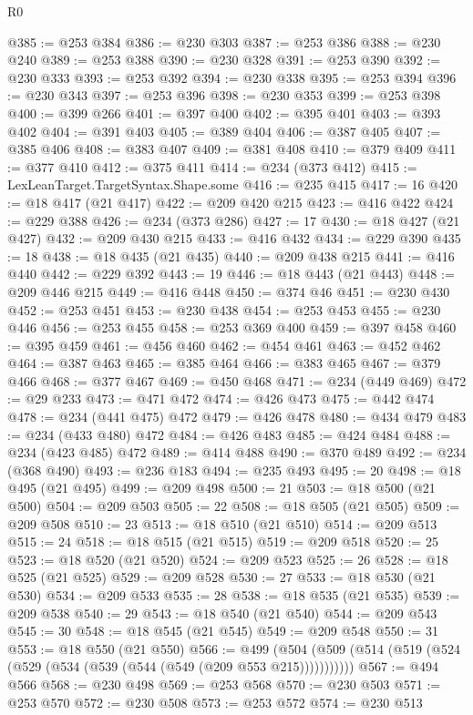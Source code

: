 \begin{lexlean}{R0}
\begin{coremodule}
@385 := @253 @384
@386 := @230 @303
@387 := @253 @386
@388 := @230 @240
@389 := @253 @388
@390 := @230 @328
@391 := @253 @390
@392 := @230 @333
@393 := @253 @392
@394 := @230 @338
@395 := @253 @394
@396 := @230 @343
@397 := @253 @396
@398 := @230 @353
@399 := @253 @398
@400 := @399 @266
@401 := @397 @400
@402 := @395 @401
@403 := @393 @402
@404 := @391 @403
@405 := @389 @404
@406 := @387 @405
@407 := @385 @406
@408 := @383 @407
@409 := @381 @408
@410 := @379 @409
@411 := @377 @410
@412 := @375 @411
@414 := @234 (@373 @412)
@415 := LexLeanTarget.TargetSyntax.Shape.some
@416 := @235 @415
@417 := 16
@420 := @18 @417 (@21 @417)
@422 := @209 @420 @215
@423 := @416 @422
@424 := @229 @388
@426 := @234 (@373 @286)
@427 := 17
@430 := @18 @427 (@21 @427)
@432 := @209 @430 @215
@433 := @416 @432
@434 := @229 @390
@435 := 18
@438 := @18 @435 (@21 @435)
@440 := @209 @438 @215
@441 := @416 @440
@442 := @229 @392
@443 := 19
@446 := @18 @443 (@21 @443)
@448 := @209 @446 @215
@449 := @416 @448
@450 := @374 @46
@451 := @230 @430
@452 := @253 @451
@453 := @230 @438
@454 := @253 @453
@455 := @230 @446
@456 := @253 @455
@458 := @253 @369 @400
@459 := @397 @458
@460 := @395 @459
@461 := @456 @460
@462 := @454 @461
@463 := @452 @462
@464 := @387 @463
@465 := @385 @464
@466 := @383 @465
@467 := @379 @466
@468 := @377 @467
@469 := @450 @468
@471 := @234 (@449 @469)
@472 := @29 @233
@473 := @471 @472
@474 := @426 @473
@475 := @442 @474
@478 := @234 (@441 @475) @472
@479 := @426 @478
@480 := @434 @479
@483 := @234 (@433 @480) @472
@484 := @426 @483
@485 := @424 @484
@488 := @234 (@423 @485) @472
@489 := @414 @488
@490 := @370 @489
@492 := @234 (@368 @490)
@493 := @236 @183
@494 := @235 @493
@495 := 20
@498 := @18 @495 (@21 @495)
@499 := @209 @498
@500 := 21
@503 := @18 @500 (@21 @500)
@504 := @209 @503
@505 := 22
@508 := @18 @505 (@21 @505)
@509 := @209 @508
@510 := 23
@513 := @18 @510 (@21 @510)
@514 := @209 @513
@515 := 24
@518 := @18 @515 (@21 @515)
@519 := @209 @518
@520 := 25
@523 := @18 @520 (@21 @520)
@524 := @209 @523
@525 := 26
@528 := @18 @525 (@21 @525)
@529 := @209 @528
@530 := 27
@533 := @18 @530 (@21 @530)
@534 := @209 @533
@535 := 28
@538 := @18 @535 (@21 @535)
@539 := @209 @538
@540 := 29
@543 := @18 @540 (@21 @540)
@544 := @209 @543
@545 := 30
@548 := @18 @545 (@21 @545)
@549 := @209 @548
@550 := 31
@553 := @18 @550 (@21 @550)
@566 := @499 (@504 (@509 (@514 (@519 (@524 (@529 (@534 (@539 (@544 (@549 (@209 @553 @215)))))))))))
@567 := @494 @566
@568 := @230 @498
@569 := @253 @568
@570 := @230 @503
@571 := @253 @570
@572 := @230 @508
@573 := @253 @572
@574 := @230 @513

\end{coremodule}
\end{lexlean}
